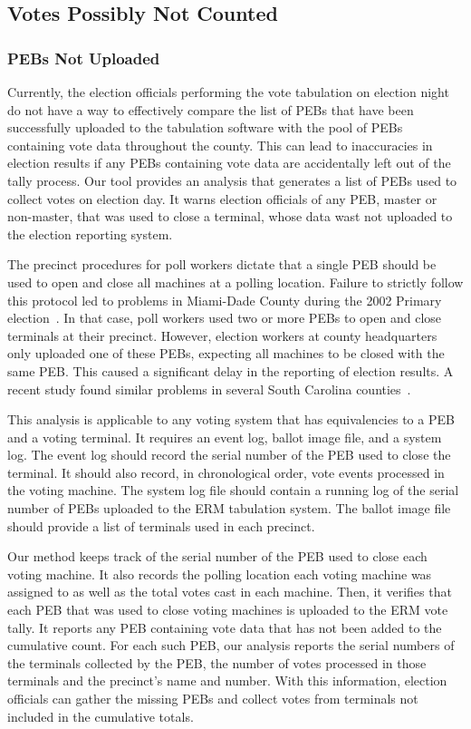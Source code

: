 \subsection{Votes Possibly Not Counted}
\subsubsection{PEBs Not Uploaded}
Currently, the election officials performing the vote tabulation on election night do not have a way to effectively compare the list of PEBs that have been successfully uploaded to the tabulation software with the pool of PEBs containing vote data throughout the county. This can lead to inaccuracies in election results if any PEBs containing vote data are accidentally left out of the tally process. Our tool provides an analysis that generates a list of PEBs used to collect votes on election day. It warns election officials of any PEB, master or non-master, that was used to close a terminal, whose data wast not uploaded to the election reporting system.   

The precinct procedures for poll workers dictate that a single PEB should be used to open and close all machines at a polling location. Failure to strictly follow this protocol led to problems in Miami-Dade County during the 2002 Primary election~\cite{Mazella2002}. In that case, poll workers used two or more PEBs to open and close terminals at their precinct.  However, election workers at county headquarters only uploaded one of these PEBs, expecting all machines to be closed with the same PEB. This caused a significant delay in the reporting of election results. A recent study found similar problems in several South Carolina counties~\cite{Buell2011}.

This analysis is applicable to any voting system that has equivalencies to a PEB and a voting terminal.  It requires an event log, ballot image file, and a system log.  The event log should record the serial number of the PEB used to close the terminal.  It should also record, in chronological order, vote events processed in the voting machine.  The system log file should contain a running log of the serial number of PEBs uploaded to the ERM tabulation system.  The ballot image file should provide a list of terminals used in each precinct.  

Our method keeps track of the serial number of the PEB used to close each voting machine. It also records the polling location each voting machine was assigned to as well as the total votes cast in each machine. Then, it verifies that each PEB that was used to close voting machines is uploaded to the ERM vote tally. It reports any PEB containing vote data that has not been added to the cumulative count.  For each such PEB, our analysis reports the serial numbers of the terminals collected by the PEB, the number of votes processed in those terminals and the precinct's name and number. With this information, election officials can gather the missing PEBs and collect votes from terminals not included in the cumulative totals.

